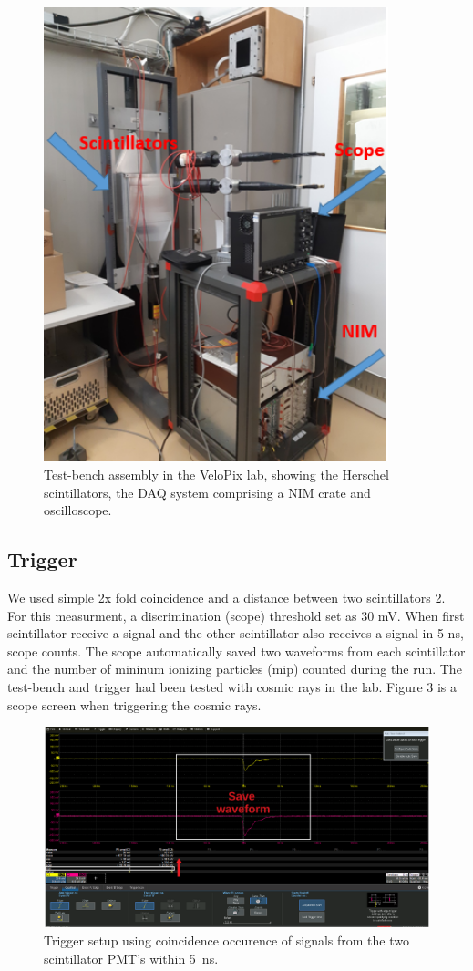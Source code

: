 \begin{figure}
\centering
    \includegraphics[width=10cm]{figs/INT/Tools.png} 
\caption{ 
    Test-bench assembly in the VeloPix lab, showing the Herschel scintillators, the DAQ system comprising a NIM crate and oscilloscope.
}
\end{figure}

\subsection{Trigger}
We used simple 2x fold coincidence and a distance between two scintillators 2\cm. 
For this measurment, a discrimination (scope) threshold set as 30 mV.
When first scintillator receive a signal and the other scintillator also receives a signal in 5 ns, scope counts.
The scope automatically saved two waveforms from each scintillator and the number of mininum ionizing particles (mip) counted during the run.
The test-bench and trigger had been tested with cosmic rays in the lab.
Figure 3 is a scope screen when triggering the cosmic rays.

\begin{figure}
\centering
    \includegraphics[width=16cm]{figs/INT/waveform.pdf}
\caption{
    Trigger setup using coincidence occurence of signals from the two scintillator PMT's within 5~ns. 
}
\end{figure}

